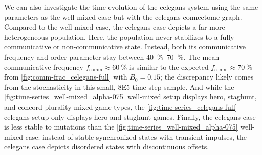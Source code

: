 \documentclass[pdflatex,lineno,referee,sn-nature]{sn-jnl}
\begin{document}
We can also investigate the time-evolution of the \gls{celegans} system
using the same parameters as the
well-mixed case but with the \gls{celegans} connectome graph.
Compared to the well-mixed case,
the  \gls{celegans} case
depicts a far more heterogeneous population.
Here, the population never stabilizes
to a fully communicative or non-communicative state.
Instead, both its communicative frequency and order parameter
stay between \SIrange{40}{70}{\percent}.
The mean communicative frequency $f_{\text{comm}} \approx \SI{60}{\percent}$
is similar to the expected $f_{\text{comm}} \approx \SI{70}{\percent}$
from \cref{fig:comm-frac_celegans-full} with $B_0 = 0.15$;
the discrepancy likely comes from the stochasticity
in this small, \num{8E5} time-step sample.
And while the \cref{fig:time-series_well-mixed_alpha-075} well-mixed setup
displays hero, staghunt, and concord plurality mixed game-types,
the \cref{fig:time-series_celegans-full} \gls{celegans} setup
only displays hero and staghunt games.
Finally, the \gls{celegans} case is less stable to mutations
than the \cref{fig:time-series_well-mixed_alpha-075} well-mixed case:
instead of stable synchronized states with transient impulses,
the \gls{celegans} case depicts disordered states with discontinuous offsets.
\end{document}
